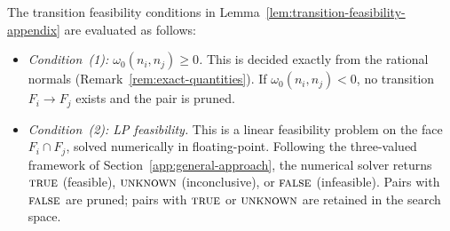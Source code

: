\begin{remark}%
\label{rem:numerical-pruning}
The transition feasibility conditions in
Lemma~\ref{lem:transition-feasibility-appendix}
are evaluated as follows:
\begin{itemize}
\item \emph{Condition~(1): $\omega_0(n_i, n_j) \geq 0$.}
  This is decided exactly from the rational normals
  (Remark~\ref{rem:exact-quantities}).
  If $\omega_0(n_i, n_j) < 0$, no transition
  $F_i \to F_j$ exists and the pair is pruned.
\item \emph{Condition~(2): LP feasibility.}
  This is a linear feasibility problem on
  the face $F_i \cap F_j$,
  solved numerically in floating-point.
  Following the three-valued framework of
  Section~\ref{app:general-approach},
  the numerical solver returns
  $\textsc{true}$ (feasible),
  $\textsc{unknown}$ (inconclusive), or
  $\textsc{false}$ (infeasible).
  Pairs with $\textsc{false}$ are pruned;
  pairs with $\textsc{true}$ or $\textsc{unknown}$
  are retained in the search space.
\end{itemize}
\end{remark}

